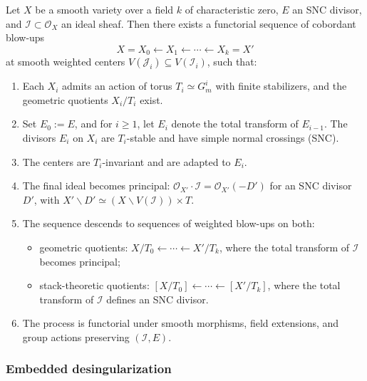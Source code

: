 \documentclass{amsart}
\newcommand{\cI}{{\mathcal I}}
\renewcommand{\setminus}{\smallsetminus}
\begin{document}
\begin{theorem}\label{principalization}
Let \( X \) be a smooth variety over a field \( k \) of characteristic zero, \( E \) an SNC divisor, and \( \mathcal{I} \subset \mathcal{O}_X \) an ideal sheaf. Then there exists a functorial sequence of cobordant blow-ups
\[
X = X_0 \leftarrow X_1 \leftarrow \cdots \leftarrow X_k = X'
\]
at smooth weighted centers \( V(\mathcal{J}_i) \subseteq V(\mathcal{I}_i) \), such that:
\begin{enumerate}
    \item Each \( X_i \) admits  an action  of torus \( T_i \simeq G_m^i \) with finite stabilizers, and the geometric quotients \( X_i / T_i \) exist.
   \item Set \( E_0 := E \), and for \( i \geq 1 \), let \( E_i \) denote the total transform of \( E_{i-1} \). The divisors \( E_i \) on \( X_i \) are \( T_i \)-stable and have simple normal crossings (SNC).
 \item The centers are \( T_i \)-invariant and are  adapted  to \( E_i \).

       \item The final ideal becomes principal: \( \mathcal{O}_{X'} \cdot \mathcal{I} = \mathcal{O}_{X'}(-D') \) for an SNC divisor \( D' \), with \( X' \setminus D' \simeq (X \setminus V(\mathcal{I})) \times T \).
    \item The sequence descends to sequences of weighted blow-ups on both:
    \begin{itemize}
        \item geometric quotients: \( X/T_0 \leftarrow \cdots \leftarrow X'/T_k \), where the total transform of $\cI$ becomes principal;
        \item stack-theoretic quotients: \( [X/T_0] \leftarrow \cdots \leftarrow [X'/T_k] \), where  the total transform of \( \mathcal{I} \) defines an SNC divisor.
    \end{itemize}
    \item The process is functorial under smooth morphisms, field extensions, and group actions preserving \( (\mathcal{I}, E) \).
\end{enumerate}
\end{theorem}

\subsubsection{Embedded desingularization}
\end{document}
